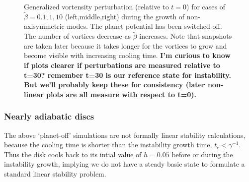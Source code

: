 \begin{figure}
{  }
\hfill
  \caption{Generalized vortensity perturbation (relative to $t=0$) for
    cases of $\tilde{\beta}=0.1,1,10$ (left,middle,right) during
    the growth of non-axisymmetric modes. The planet potential has
    been switched off.  The number of vortices
    decrease as $\tilde{\beta}$ increases. Note that snapshots are
    taken later because it takes longer for the vortices to grow and
    become visible with increasing cooling time. 
    \label{2Dlinear} {\bf I'm curious to know if plots clearer if
      perturbations are measured relative to t=30? remember t=30 is
      our reference state for instability. But we'll probably keep
      these for consistency (later non-linear plots are all measure
      with respect to t=0).}} 
\end{figure}

\subsubsection{Nearly adiabatic discs}
\label{adiabatic_section}
The above `planet-off' simulations are not formally linear
stability calculations, because the cooling time is shorter
than the instability growth time, 
%
$t_c<\gamma^{-1}$.  
Thus the disk cools back to its intial value of $h=0.05$
before or during the instability growth, implying we do not have a
steady basic state to formulate a standard linear stability
problem. %

